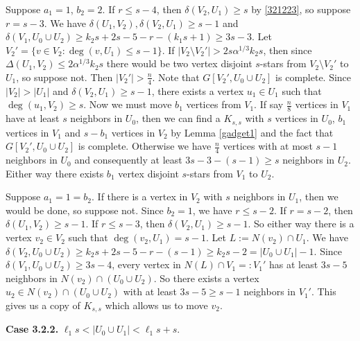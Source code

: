 \documentclass[oneside,12pt]{memoir}
\begin{document}
Suppose $a_1=1$, $b_2=2$.  If $r\leq s-4$, then $\delta(V_2, U_1)\geq s$ by \eqref{321223}, so suppose $r= s-3$.  We have $\delta(U_1, V_2), \delta(V_2, U_1)\geq s-1$ and $\delta(V_1, U_0\cup U_2)\geq k_2s+2s-5-r-(k_1s+1)\geq 3s-3$.  Let $V_2'=\{v\in V_2:\deg(v, U_1)\leq s-1\}$.  If $|V_2\setminus V_2'|>2s\alpha^{1/3}k_2s$, then since $\Delta(U_1, V_2)\leq 2\alpha^{1/3}k_2s$ there would be two vertex disjoint $s$-stars from $V_2\setminus V_2'$ to $U_1$, so suppose not.  Then $|V_2'|>\frac{n}{4}$.  Note that $G[V_2', U_0\cup U_2]$ is complete.  Since $|V_2|>|U_1|$ and $\delta(V_2, U_1)\geq s-1$, there exists a vertex $u_1\in U_1$ such that $\deg(u_1, V_2)\geq s$.  Now we must move $b_1$ vertices from $V_1$.  If say $\frac{n}{8}$ vertices in $V_1$ have at least $s$ neighbors in $U_0$, then we can find a $K_{s,s}$ with $s$ vertices in $U_0$, $b_1$ vertices in $V_1$ and $s-b_1$ vertices in $V_2$ by Lemma \ref{gadget1} and the fact that $G[V_2', U_0\cup U_2]$ is complete.  Otherwise we have $\frac{n}{4}$ vertices with at most $s-1$ neighbors in $U_0$ and consequently at least $3s-3-(s-1)\geq s$ neighbors in $U_2$.  Either way there exists $b_1$ vertex disjoint $s$-stars from $V_1$ to $U_2$. 


Suppose $a_1=1=b_2$.  If there is a vertex in $V_2$ with $s$ neighbors in $U_1$, then we would be done, so suppose not.  Since $b_2=1$, we have $r\leq s-2$.  If $r=s-2$, then $\delta(U_1, V_2)\geq s-1$.  If $r\leq s-3$, then $\delta(V_2, U_1)\geq s-1$.  So either way there is a vertex $v_2\in V_2$ such that $\deg(v_2, U_1)= s-1$.  Let $L:=N(v_2)\cap U_1$.  We have $\delta(V_2, U_0\cup U_2)\geq k_2s+2s-5-r-(s-1)\geq k_2s-2=|U_0\cup U_1|-1$.  Since $\delta(V_1, U_0\cup U_2)\geq 3s-4$, every vertex in $N(L)\cap V_1=:V_1'$ has at least $3s-5$ neighbors in $N(v_2)\cap (U_0\cup U_2)$. So there exists a vertex $u_2\in N(v_2)\cap (U_0\cup U_2)$ with at least $3s-5\geq s-1$ neighbors in $V_1'$.  This gives us a copy of $K_{s,s}$ which allows us to move $v_2$.

\textbf{Case 3.2.2.} $\ell_1s<|U_0\cup U_1|<\ell_1s+s$.  
\end{document}
